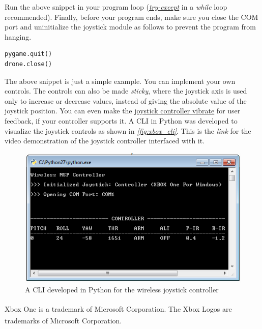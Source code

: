 \documentclass[a4paper,12pt,oneside]{book}
\begin{document}
\bigskip

Run the above snippet in your program loop (\href{https://www.youtube.com/watch?v=NIWwJbo-9_8}{\textit{try-except}} in a \textit{while} loop recommended). Finally, before your program ends, make sure you close the COM port and uninitialize the joystick module as follows to prevent the program from hanging.\\

\begin{verbatim}
pygame.quit()
drone.close()
\end{verbatim}

\bigskip

The above snippet is just a simple example. You can implement your own controls. The controls can also be made \textit{sticky}, where the joystick axis is used only to increase or decrease values, instead of giving the absolute value of the joystick position. You can even make the \href{https://stackoverflow.com/questions/19749404/is-it-possible-to-rumble-a-xbox-360-controller-with-python}{joystick controller vibrate} for user feedback, if your controller supports it. A CLI in Python was developed to visualize the joystick controls as shown in \textit{\autoref{fig:xbox_cli}}. This is the \textit{link} for the video demonstration of the joystick controller interfaced with it.\\

\begin{figure}[!htb]
\centering
\includegraphics[width=\textwidth]{images/xbox_cli}
\caption{A CLI developed in Python for the wireless joystick controller}
\label{fig:xbox_cli}
\end{figure}



\begin{thebibliography}{20}

Xbox\textsuperscript{\textregistered} One is a trademark of Microsoft Corporation. The Xbox\textsuperscript{\textregistered} Logos are trademarks of Microsoft\textsuperscript{\textregistered} Corporation.

\end{thebibliography}

\end{document}
